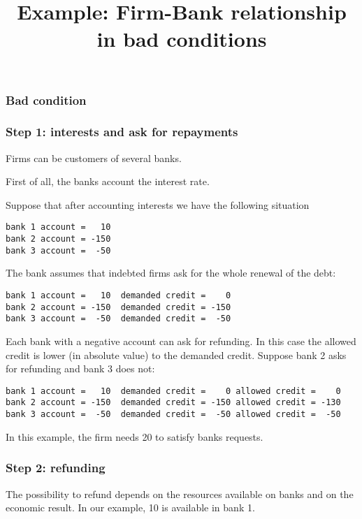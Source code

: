 \documentclass[a4paper]{article}
\title{Example: Firm-Bank relationship in bad conditions}
\begin{document}
\maketitle

\subsubsection{Bad condition}
\subsubsection*{Step 1: interests and ask for repayments}
Firms can be customers of several banks.

First of all, the banks account the interest rate.

Suppose that after accounting interests we have the following situation
\begin{verbatim}
bank 1 account =   10
bank 2 account = -150
bank 3 account =  -50
\end{verbatim}

The bank assumes that indebted firms ask for the whole renewal of the debt:

\begin{verbatim}
bank 1 account =   10  demanded credit =    0
bank 2 account = -150  demanded credit = -150
bank 3 account =  -50  demanded credit =  -50
\end{verbatim}

Each bank with a negative account can ask for refunding. In this case the allowed credit is lower (in absolute value) to the demanded credit.
Suppose bank 2 asks for refunding and bank 3 does not:

\begin{verbatim}
bank 1 account =   10  demanded credit =    0 allowed credit =    0
bank 2 account = -150  demanded credit = -150 allowed credit = -130 
bank 3 account =  -50  demanded credit =  -50 allowed credit =  -50
\end{verbatim}

In this example, the firm needs 20 to satisfy banks requests.

\subsubsection*{Step 2: refunding}

The possibility to refund depends on the resources available on banks and on the economic result. In our example, 10 is available in bank 1.
\end{document}
